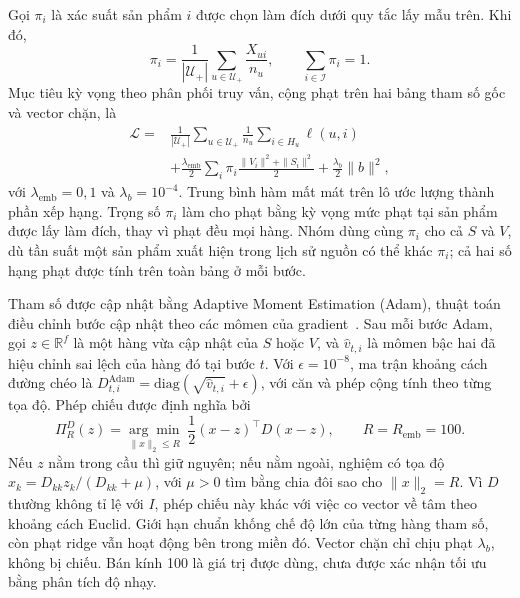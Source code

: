 Gọi $\pi_i$ là xác suất sản phẩm $i$ được chọn làm đích dưới quy tắc lấy mẫu trên. Khi đó,
\begin{equation}
\pi_i=\frac{1}{|\mathcal{U}_+|}\sum_{u\in\mathcal{U}_+}\frac{X_{ui}}{n_u},
\qquad \sum_{i\in\mathcal{I}}\pi_i=1.
\label{eq:dfhf-exposure}
\end{equation}
Mục tiêu kỳ vọng theo phân phối truy vấn, cộng phạt trên hai bảng tham số gốc và vector chặn, là
\begin{equation}
\begin{aligned}
\mathcal{L}={}&\frac{1}{|\mathcal{U}_+|}\sum_{u\in\mathcal{U}_+}\frac{1}{n_u}\sum_{i\in H_u}\ell(u,i)\\
&+\frac{\lambda_{\mathrm{emb}}}{2}\sum_i\pi_i\frac{\|V_i\|^2+\|S_i\|^2}{2}
+\frac{\lambda_b}{2}\|b\|^2,
\end{aligned}
\label{eq:dfhf-objective}
\end{equation}
với $\lambda_{\mathrm{emb}}=0{,}1$ và $\lambda_b=10^{-4}$. Trung bình hàm mất mát trên lô ước lượng thành phần xếp hạng. Trọng số $\pi_i$ làm cho phạt bằng kỳ vọng mức phạt tại sản phẩm được lấy làm đích, thay vì phạt đều mọi hàng. Nhóm dùng cùng $\pi_i$ cho cả $S$ và $V$, dù tần suất một sản phẩm xuất hiện trong lịch sử nguồn có thể khác $\pi_i$; cả hai số hạng phạt được tính trên toàn bảng ở mỗi bước.

Tham số được cập nhật bằng Adaptive Moment Estimation (Adam), thuật toán điều chỉnh bước cập nhật theo các mômen của gradient~\cite{kingma2015adam}. Sau mỗi bước Adam, gọi $z\in\mathbb{R}^f$ là một hàng vừa cập nhật của $S$ hoặc $V$, và $\hat v_{t,i}$ là mômen bậc hai đã hiệu chỉnh sai lệch của hàng đó tại bước $t$. Với $\epsilon=10^{-8}$, ma trận khoảng cách đường chéo là $D_{t,i}^{\mathrm{Adam}}=\mathrm{diag}(\sqrt{\hat v_{t,i}}+\epsilon)$, với căn và phép cộng tính theo từng tọa độ. Phép chiếu được định nghĩa bởi
\begin{equation}
\Pi_{R}^{D}(z)=\underset{\|x\|_2\le R}{\arg\min}\;
\frac12(x-z)^\top D(x-z),\qquad R=R_{\mathrm{emb}}=100.
\label{eq:dfhf-metric-projection}
\end{equation}
Nếu $z$ nằm trong cầu thì giữ nguyên; nếu nằm ngoài, nghiệm có tọa độ $x_k=D_{kk}z_k/(D_{kk}+\mu)$, với $\mu>0$ tìm bằng chia đôi sao cho $\|x\|_2=R$. Vì $D$ thường không tỉ lệ với $I$, phép chiếu này khác với việc co vector về tâm theo khoảng cách Euclid. Giới hạn chuẩn khống chế độ lớn của từng hàng tham số, còn phạt ridge vẫn hoạt động bên trong miền đó. Vector chặn chỉ chịu phạt $\lambda_b$, không bị chiếu. Bán kính 100 là giá trị được dùng, chưa được xác nhận tối ưu bằng phân tích độ nhạy.

